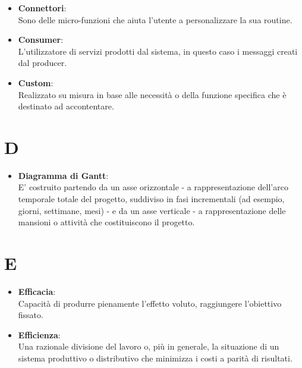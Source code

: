 \documentclass[a4paper, oneside, openany, dvipsnames, table]{article}
\begin{document}
\begin{itemize}
\item \textbf{Connettori}:\\	Sono delle micro-funzioni che aiuta l'utente a personalizzare la sua routine.
\end{itemize}

\begin{itemize}
\item \textbf{Consumer}:\\	L'utilizzatore di servizi prodotti dal sistema, in questo caso i messaggi creati dal producer.
\end{itemize}

\begin{itemize}
\item \textbf{Custom}:\\	Realizzato su misura in base alle necessità  o della funzione specifica che è destinato ad accontentare.	
\end{itemize}

\newpage
\section{D}
\begin{itemize}
\item \textbf{Diagramma di Gantt}:\\	E' costruito partendo da un asse orizzontale - a rappresentazione dell'arco temporale totale del progetto, suddiviso in fasi incrementali (ad esempio, giorni, settimane, mesi) - e da un asse verticale - a rappresentazione delle mansioni o attività che costituiscono il progetto.
\end{itemize}

\newpage
\section{E}
\begin{itemize}
\item \textbf{Efficacia}:\\	Capacità di produrre pienamente l’effetto voluto, raggiungere l'obiettivo fissato.
\end{itemize}


\begin{itemize}
\item \textbf{Efficienza}:\\	Una razionale divisione del lavoro o, più in generale, la situazione di un sistema produttivo o distributivo che minimizza i costi a parità di risultati.
\end{itemize}
\end{document}

